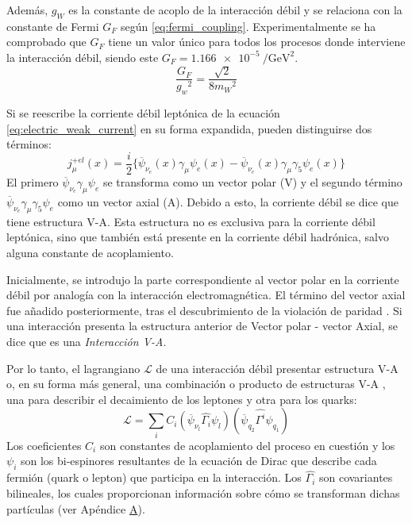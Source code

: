 Además, $g_W$ es la constante de acoplo de la interacción débil y se relaciona con la constante de Fermi $G_F$ según \ref{eq:fermi_coupling}. Experimentalmente se ha comprobado que $G_F$ tiene un valor único para todos los procesos donde interviene la interacción débil, siendo este $G_{F}= \SI{1,166e-5}{\per\GeV\squared}$.
\begin{equation}
\dfrac{G_{F}}{{g_{w}}^2}=\dfrac{\sqrt{2}}{8{m_{W}}^2}\label{eq:fermi_coupling}
\end{equation}

Si se reescribe la corriente débil leptónica de la ecuación \ref{eq:electric_weak_current} en su forma expandida, pueden distinguirse dos términos:
\begin{equation}
j_{\mu}^{+el}\left(x\right)= \dfrac{i}{2} \{ \overline{\psi}_{{\nu}_{e}}\left(x\right)\gamma _{\mu}\psi_{e}\left( x\right)- \overline{\psi}_{{\nu}_{e}}\left(x\right)\gamma _{\mu}\gamma_{5}\psi_{e}\left( x\right) \}
\end{equation}
El primero $\overline{\psi}_{{\nu}_{e}}\gamma _{\mu}\psi_{e}$ se transforma como un vector polar (V) y el segundo término $\overline{\psi}_{{\nu}_{e}}\gamma _{\mu}\gamma_{5}\psi_{e}$ como un vector axial (A). Debido a esto, la corriente débil se dice que tiene estructura V-A. Esta estructura no es exclusiva para la corriente débil leptónica, sino que también está presente en la corriente débil hadrónica, salvo alguna constante de acoplamiento. 

Inicialmente, se introdujo la parte correspondiente al vector polar en la corriente débil por analogía con la interacción electromagnética. El término del vector axial fue añadido posteriormente, tras el descubrimiento de la violación de paridad \cite{Paschos}. Si una interacción presenta la estructura anterior de Vector polar - vector Axial, se dice que es una \textit{Interacción V-A}.

Por lo tanto, el lagrangiano $\mathcal{L}$ de una interacción débil presentar estructura V-A o, en su forma más general, una combinación o producto de estructuras V-A \cite{Renton}, una para describir el decaimiento de los leptones y otra para los quarks:
\begin{equation}
\mathcal{L}= \sum _{i} C_{i}\left(\overline{\psi}_{\nu_l}\widehat{\Gamma_{i}}\psi _{l}\right)\left( \overline{\psi }_{q_2}\widehat{\Gamma^{i}}\psi _{q_1}\right)
\end{equation}
Los coeficientes $C_i$ son constantes de acoplamiento del proceso en cuestión y los $\psi_i$ son los bi-espinores resultantes de la ecuación de Dirac que describe cada fermión (quark o lepton) que participa en la interacción. Los $\widehat{\Gamma_{i}}$ son covariantes bilineales, los cuales proporcionan información sobre cómo se transforman dichas partículas (ver Apéndice \hyperref[cap:A]{A}).


